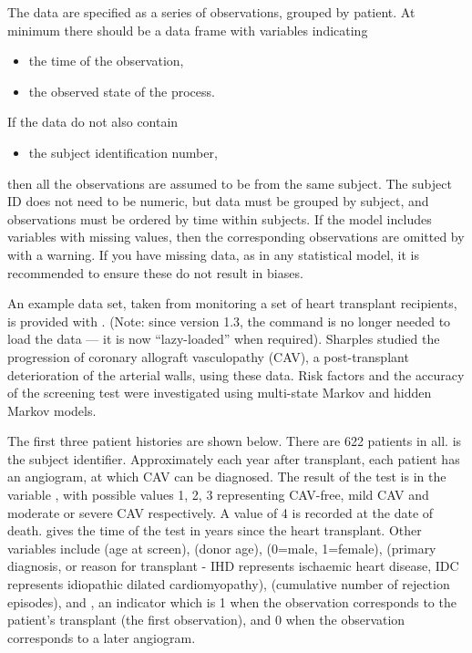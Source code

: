 The data are specified as a series of observations, grouped by
patient. At minimum there should be a data frame with variables
indicating
\begin{itemize}
\item the time of the observation,
\item the observed state of the process.
\end{itemize}
If the data do not also contain
\begin{itemize}
\item the subject identification number,
\end{itemize}
then all the observations are assumed to be from the same subject.
The subject ID does not need to be numeric, but data must be grouped
by subject, and observations must be ordered by time within subjects.
If the model includes variables with missing values, then the corresponding
observations  are omitted by  with a warning.  If you have missing data,
as in any statistical model, it is recommended to ensure these do not
result in biases.

An example data set, taken from monitoring a set of heart transplant
recipients, is provided with .  (Note: since 
version 1.3, the command  is no longer needed to
load the data --- it is now ``lazy-loaded'' when required). Sharples
\etal \cite{my:cav} studied the progression of coronary allograft
vasculopathy (CAV), a post-transplant deterioration of the arterial
walls, using these data.  Risk factors and the accuracy of the
screening test were investigated using multi-state Markov and hidden
Markov models.

The first three patient histories are shown below. There are 622
patients in all.   is the subject identifier.
Approximately each year after transplant, each patient has an
angiogram, at which CAV can be diagnosed.  The result of the test is
in the variable , with possible values 1, 2, 3
representing CAV-free, mild CAV and moderate or severe CAV
respectively.  A value of 4 is recorded at the date of death.
 gives the time of the test in years since the heart
transplant. Other variables include  (age at screen),
 (donor age),  (0=male, 1=female),
 (primary diagnosis, or reason for transplant - IHD
represents ischaemic heart disease, IDC represents idiopathic dilated
cardiomyopathy),  (cumulative number of rejection
episodes), and , an indicator which is 1 when the
observation corresponds to the patient's transplant (the first
observation), and 0 when the observation corresponds to a later
angiogram.

